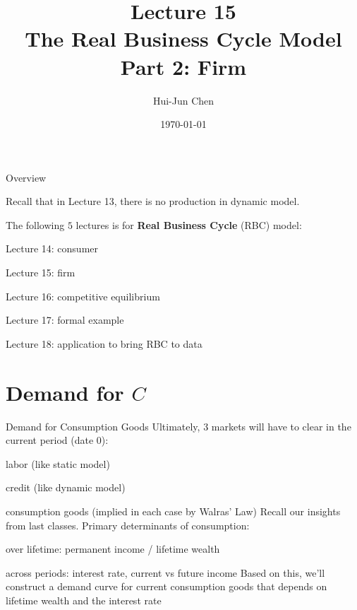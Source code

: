 \documentclass[11pt,aspectratio=169,usenames,dvipsnames]{beamer}
\title[Lecture 15]{Lecture 15 \\ The Real Business Cycle Model \\ Part 2: Firm}
\author[Hui-Jun Chen]{Hui-Jun Chen}
\institute[NTHU]{National Tsing Hua University}
\date{\today}
\let\tempone\itemize
\let\temptwo\enditemize
\renewenvironment{itemize}{\tempone\addtolength{\itemsep}{\fill}}{\temptwo}
\let\tempa\enumerate
\let\tempb\endenumerate
\renewenvironment{enumerate}{\tempa\addtolength{\itemsep}{\fill}}{\tempb}
\begin{document}
\begin{frame}[plain]
    \titlepage
\end{frame}


\begin{frame}{Overview}
\label{slide:Overview}
    \begin{itemize}
        \item Recall that in Lecture 13, there is no production in dynamic model.
        \item The following $ 5 $ lectures is for \textbf{Real Business Cycle} (RBC) model:
        \begin{itemize}
            \item Lecture 14: consumer
            \item Lecture 15: firm
            \item Lecture 16: competitive equilibrium
            \item Lecture 17: formal example
            \item Lecture 18: application to bring RBC to data
        \end{itemize}
    \end{itemize}
\end{frame}

\section{Demand for $ C $}
\label{sec:Demand_for___C__}


\begin{frame}{Demand for Consumption Goods}
\label{slide:Demand_for_Consumption_Goods}
    Ultimately, 3 markets will have to clear in the current period (date 0):
    \begin{enumerate}
        \item labor (like static model)
        \item credit (like dynamic model)
        \item consumption goods (implied in each case by Walras’ Law)
    \end{enumerate}
    Recall our insights from last classes. Primary determinants of consumption:
    \begin{itemize}
        \item over lifetime: permanent income / lifetime wealth
        \item across periods: interest rate, current vs future income
    \end{itemize}
    Based on this, we’ll construct a \alert{demand curve for current consumption} goods that depends on lifetime wealth and the interest rate
\end{frame}
\end{document}
